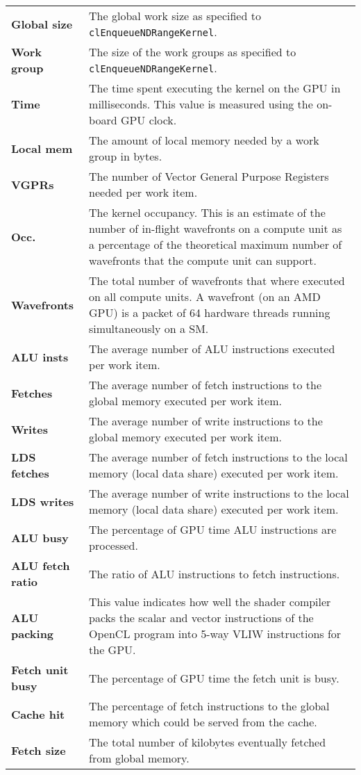 \begin{table}
	\vspace{\baselineskip}
	
	\begin{tabularx}{\textwidth}{>{\bfseries}l X}
		Global size &
		The global work size as specified to \lstinline!clEnqueueNDRangeKernel!. \\
		Work group &
		The size of the work groups as specified to \lstinline!clEnqueueNDRangeKernel!. \\
		Time &
		The time spent executing the kernel on the GPU in milliseconds. This value is measured using the on-board GPU clock. \\
		Local mem &
		The amount of local memory needed by a work group in bytes. \\
		VGPRs &
		The number of Vector General Purpose Registers needed per work item. \\
		Occ. &
		The kernel occupancy. This is an estimate of the number of in-flight wavefronts on a compute unit as a percentage of the theoretical maximum number of wavefronts that the compute unit can support. \\
		Wavefronts &
		The total number of wavefronts that where executed on all compute units. A wavefront (on an AMD GPU) is a packet of 64 hardware threads running simultaneously on a SM. \\
		ALU insts &
		The average number of ALU instructions executed per work item. \\
		Fetches &
		The average number of fetch instructions to the global memory executed per work item. \\
		Writes &
		The average number of write instructions to the global memory executed per work item. \\
		LDS fetches &
		The average number of fetch instructions to the local memory (local data share) executed per work item. \\
		LDS writes &
		The average number of write instructions to the local memory (local data share) executed per work item. \\
		ALU busy &
		The percentage of GPU time ALU instructions are processed. \\
		ALU fetch ratio &
		The ratio of ALU instructions to fetch instructions. \\
		ALU packing &
		This value indicates how well the shader compiler packs the scalar and vector instructions of the OpenCL program into 5-way VLIW instructions for the GPU. \\
		Fetch unit busy &
		The percentage of GPU time the fetch unit is busy. \\
		Cache hit &
		The percentage of fetch instructions to the global memory which could be served from the cache. \\
		Fetch size &
		The total number of kilobytes eventually fetched from global memory. \\
	\end{tabularx}
		

\end{table}
